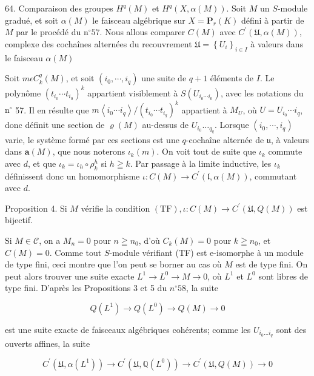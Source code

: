 64. Comparaison des groupes $H^{q}(M)$ et $H^{q}(X, \alpha(M)) .$ Soit $M$ un $S$-module gradué, et soit $\alpha(M)$ le faisceau algébrique sur $X=\mathbf{P}_{r}(K)$ défini à partir de $M$ par le procédé du $\mathrm{n}^{\circ} 57$. Nous allous comparer $C(M)$ avec $C^{\prime}(\mathfrak{U}, \alpha(M))$, complexe des cochaînes alternées du recouvrement $\mathfrak{U}=\left\{U_{i}\right\}_{i \in I}$ à valeurs dans le faisceau $\alpha(M)$

Soit $m \epsilon C_{k}^{q}(M)$, et soit $\left(i_{0}, \cdots, i_{q}\right)$ une suite de $q+1$ éléments de $I$. Le polynôme $\left(t_{i_{0}} \cdots t_{i_{0}}\right)^{k}$ appartient visiblement à $S\left(U_{i_{0} \cdots i_{0}}\right)$, avec les notations du $\mathrm{n}^{\circ}$ 57. Il en résulte que $m\left\langle i_{0} \cdots i_{q}\right\rangle /\left(t_{i_{0}} \cdots t_{i_{q}}\right)^{k}$ appartient à $M_{U}$, où $U=U_{i_{0}} \cdots i_{q}$, donc définit une section de $\varrho(M)$ au-dessus de $U_{i_{0}} \ldots_{q_{q}} .$ Lorsque $\left(i_{0}, \cdots, i_{q}\right)$ varie, le système formé par ces sections est une $q$-cochaîne alternée de $\mathfrak{u}$, à valeurs dans $\boldsymbol{a}(M)$, que nous noterons $\iota_{k}(m) .$ On voit tout de suite que $\iota_{k}$ commute avec $d$, et que $\iota_{k}=\iota_{h} \circ \rho_{k}^{h}$ si $h \geqq k$. Par passage à la limite inductive, les $\iota_{k}$ définissent donc un homomorphisme $\iota: C(M) \rightarrow C^{\prime}(\mathfrak{l}, \alpha(M))$, commutant avec $d$.

Proposition 4. Si $M$ vérifie la condition $(\mathrm{TF}), \iota: C(M) \rightarrow C^{\prime}(\mathfrak{U}, Q(M))$ est bijectif.

Si $M \in \mathcal{C}$, on a $M_{n}=0$ pour $n \geqq n_{0}$, d'où $C_{k}(M)=0$ pour $k \geqq n_{0}$, et $C(M)=0$. Comme tout $S$-module vérifiant (TF) est e-isomorphe à un module de type fini, ceci montre que l'on peut se borner au cas où $M$ est de type fini. On peut alors trouver une suite exacte $L^{1} \rightarrow L^{0} \rightarrow M \rightarrow 0$, où $L^{1}$ et $L^{0}$ sont libres de type fini. D'après les Propositions 3 et 5 du $n^{\circ} 58$, la suite

$$
Q\left(L^{1}\right) \rightarrow Q\left(L^{0}\right) \rightarrow Q(M) \rightarrow 0
$$

est une suite exacte de faisceaux algébriques cohérents; comme les $U_{i_{0} \ldots i_{q}}$ sont des ouverts affines, la suite

$$
C^{\prime}\left(\mathfrak{U}, \alpha\left(L^{1}\right)\right) \rightarrow C^{\prime}\left(\mathfrak{U}, \mathbb{Q}\left(L^{0}\right)\right) \rightarrow C^{\prime}(\mathfrak{U}, Q(M)) \rightarrow 0
$$

